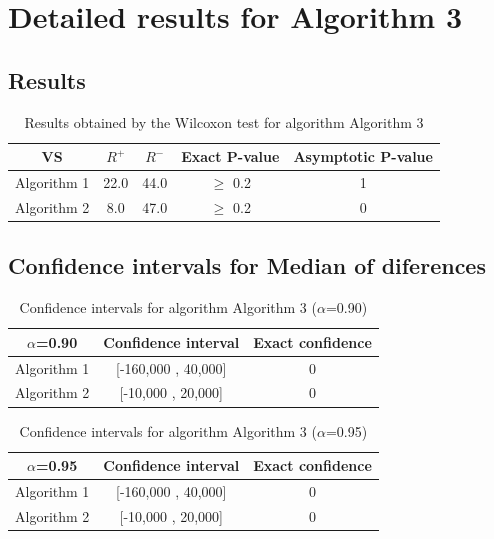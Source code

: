 \documentclass[a4paper,10pt]{article}
\begin{document}
 \clearpage 


\section{Detailed results for Algorithm 3}


\subsection{Results}

\begin{table}[!htp]
\centering\small
\begin{tabular}{
|c|c|c|c|c|}
\hline
 VS & $R^{+}$ & $R^{-}$ & Exact P-value & Asymptotic P-value \\ \hline 
Algorithm 1 & 22.0 & 44.0 & $\geq$ 0.2 & 1\\ \hline 
Algorithm 2 & 8.0 & 47.0 & $\geq$ 0.2 & 0\\ \hline 

\end{tabular}
\caption{Results obtained by the Wilcoxon test for algorithm Algorithm 3}
\end{table}

\subsection{Confidence intervals for Median of diferences}

\begin{table}[!htp]
\centering\small
\begin{tabular}{
|c|c|c|}
\hline
 $\alpha$=0.90 & Confidence interval & Exact confidence \\ \hline 
Algorithm 1 & [-160,000 , 40,000] & 0\\ \hline 
Algorithm 2 & [-10,000 , 20,000] & 0\\ \hline 

\end{tabular}
\caption{Confidence intervals for algorithm Algorithm 3 ($\alpha$=0.90)}
\end{table}
\begin{table}[!htp]
\centering\small
\begin{tabular}{
|c|c|c|}
\hline
 $\alpha$=0.95 & Confidence interval & Exact confidence \\ \hline 
Algorithm 1 & [-160,000 , 40,000] & 0\\ \hline 
Algorithm 2 & [-10,000 , 20,000] & 0\\ \hline 

\end{tabular}
\caption{Confidence intervals for algorithm Algorithm 3 ($\alpha$=0.95)}
\end{table}

 \clearpage 
\end{document}
